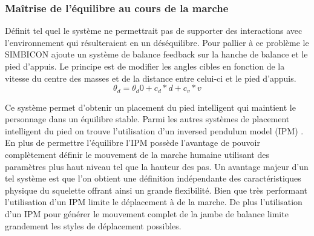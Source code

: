 \documentclass{llncs}
\begin{document}
\subsubsection{Maîtrise de l'équilibre au cours de la marche}
Définit tel quel le système ne permettrait pas de supporter des interactions avec l'environnement qui résulteraient en un déséquilibre. Pour pallier à ce problème le SIMBICON ajoute un système de balance feedback sur la hanche de balance et le pied d'appuis. Le principe est de modifier les angles cibles en fonction de la vitesse du centre des masses et de la distance entre celui-ci et le pied d'appuis. 
\[
\theta_d=\theta_d0 + c_d*d + c_v*v 
\]

Ce système permet d'obtenir un placement du pied intelligent qui maintient le personnage dans un équilibre stable. Parmi les autres systèmes de placement intelligent du pied on trouve l'utilisation d'un inversed pendulum model (IPM) \cite{kajita20013d,coros2010generalized}. En plus de permettre l'équilibre l'IPM possède l'avantage de pouvoir complètement définir le mouvement de la marche humaine utilisant des paramètres plus haut niveau tel que la hauteur des pas. Un avantage majeur d'un tel système est que l'on obtient une définition indépendante des caractéristiques physique du squelette offrant ainsi un grande flexibilité. Bien que très performant l'utilisation d'un IPM limite le déplacement à de la marche. De plus l'utilisation d'un IPM pour générer le mouvement complet de la jambe de balance limite grandement les styles de déplacement possibles.
\end{document}
